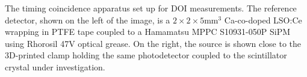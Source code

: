 \label{fig:actualsetup} The timing coincidence apparatus set up for DOI measurements. The reference detector, shown on the left of the image, is a $2\times2\times5$mm$^3$ Ca-co-doped LSO:Ce wrapping in PTFE tape coupled to a Hamamatsu MPPC S10931-050P SiPM using Rhorosil 47V optical grease. On the right, the source is shown close to the 3D-printed clamp holding the same photodetector coupled to the scintillator crystal under investigation.